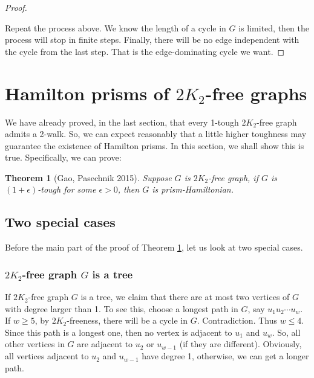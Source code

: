 \documentclass[12pt]{report}
\newtheorem{theorem}{Theorem}
\begin{document}
\begin{proof}
\begin{enumerate}
\begin{enumerate}
\end{enumerate}
\end{enumerate}

Repeat the process above. We know the length of a cycle in $G$ is limited, then the process will stop in finite steps. Finally, there will be no edge independent with the cycle from the last step. That is the edge-dominating cycle we want.




\end{proof}








\section{Hamilton prisms of $2K_2$-free graphs}\label{sec55hpo2}

We have already proved, in the last section, that every 1-tough $2K_2$-free graph admits a 2-walk. So, we can expect reasonably that a little higher toughness may guarantee the existence of Hamilton prisms. In this section, we shall show this is true. Specifically, we can prove:
\begin{theorem}[Gao, Pasechnik 2015]\label{mthm21ettohpr}
Suppose $G$ is $2K_2$-free graph, if $G$ is $(1+\epsilon)$-tough for some $\epsilon>0$, then $G$ is prism-Hamiltonian.
\end{theorem}

\subsection{Two special cases}
Before the main part of the proof of Theorem \ref{mthm21ettohpr}, let us look at two special cases.
\subsubsection{$2K_2$-free graph $G$ is a tree}
If $2K_2$-free graph $G$ is a tree, we claim that there are at most two vertices of $G$ with degree larger than 1.
To see this, choose a longest path in $G$, say $u_1u_2\cdots u_w$. If $w\ge5$, by $2K_2$-freeness, there will be a cycle in $G$. Contradiction. Thus $w\le4$. Since this path is a longest one, then no vertex is adjacent to $u_1$ and $u_w$. So, all other vertices in $G$ are adjacent to $u_2$ or $u_{w-1}$ (if they are different). Obviously, all vertices adjacent to $u_2$ and $u_{w-1}$ have degree 1, otherwise, we can get a longer path.
\end{document}
